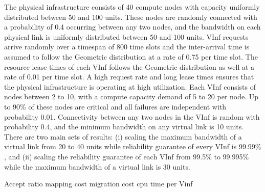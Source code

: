 The physical infrastructure consists of 40 compute
nodes with capacity uniformly distributed between 50 and 100 units. These nodes are
randomly connected with a probability of 0.4 occurring between any two nodes, and the
bandwidth on each physical link is uniformly distributed between 50 and 100 units. VInf
requests arrive randomly over a timespan of 800 time slots and the inter-arrival time is
assumed to follow the Geometric distribution at a rate of 0.75 per time slot. The resource
lease times of each VInf follows the Geometric distribution as well at a rate of 0.01 per time
slot. A high request rate and long lease times ensures that the physical infrastructure is
operating at high utilization. Each VInf consists of nodes between 2 to 10, with a compute
capacity demand of 5 to 20 per node. Up to 90$\%$ of these nodes are critical and all failures
are independent with probability 0.01. Connectivity between any two nodes in the VInf is
random with probability 0.4, and the minimum bandwidth on any virtual link is 10 units.
There are two main sets of results: (i) scaling the maximum bandwidth of a virtual link
from 20 to 40 units while reliability guarantee of every VInf is 99.99$\%$, and (ii) scaling the
reliability guarantee of each VInf from 99.5$\%$ to 99.995$\%$ while the maximum bandwidth
of a virtual link is 30 units.


Accept ratio
mapping cost
migration cost
cpu time per Vinf

